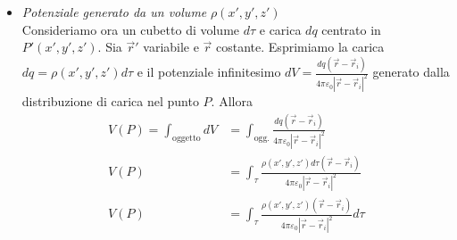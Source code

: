 \begin{itemize}
	\item \emph{Potenziale generato da un volume} $\rho (x',y',z') $ \\
	Consideriamo ora un cubetto di volume $d\tau$ e carica $dq$ centrato in $P'(x',y',z')$. Sia $\vec{r}'$ variabile e $\vec{r}$ costante. Esprimiamo la carica $ dq = \rho (x',y',z') d\tau  $ e il potenziale infinitesimo $ dV = \frac{dq (\vec{r} -\vec{r}_i )}{4\pi \varepsilon_0 |\vec{r} -\vec{r}_i |^2} $ generato dalla distribuzione di carica nel punto $P$. Allora
	\begin{align*}
		V (P) = \int_{\text{oggetto}} dV &= \int_{\text{ogg.}} \frac{dq (\vec{r} -\vec{r}_i )}{4\pi \varepsilon_0 |\vec{r} -\vec{r}_i |^2}\\
		V (P) &= \int_{\tau} \frac{\rho (x',y',z') d\tau (\vec{r} -\vec{r}_i )}{4\pi \varepsilon_0 |\vec{r} -\vec{r}_i |^2} \\
		V (P) &= \int_{\tau} \frac{\rho (x',y',z') (\vec{r} -\vec{r}_i )}{4\pi \varepsilon_0 |\vec{r} -\vec{r}_i |^2}d\tau
	\end{align*}
	\begin{figure}[htpb]
		\centering
		


		\begin{tikzpicture}[x=0.75pt,y=0.75pt,yscale=-1,xscale=1]


\end{tikzpicture}
\end{figure}
\end{itemize}
